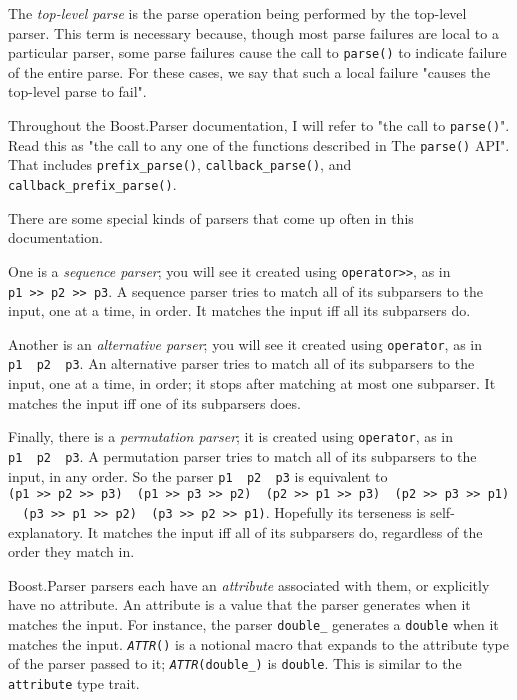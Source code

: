 \documentclass{MyBook}
\begin{document}
The \emph{top-level parse} is the parse operation being performed by the top-level parser. This term is necessary because, though most parse failures are local to a particular parser, some parse failures cause the call to \texttt{parse()} to indicate failure of the entire parse. For these cases, we say that such a local failure "causes the top-level parse to fail".

Throughout the Boost.Parser documentation, I will refer to "the call to \texttt{parse()}". Read this as "the call to any one of the functions described in The \texttt{parse()} API". That includes \texttt{prefix\_parse()}, \texttt{callback\_parse()}, and \texttt{callback\_prefix\_parse()}.

There are some special kinds of parsers that come up often in this documentation.

One is a \emph{sequence parser}; you will see it created using \texttt{operator>>}, as in \texttt{p1\ >>\ p2\ >>\ p3}. A sequence parser tries to match all of its subparsers to the input, one at a time, in order. It matches the input iff all its subparsers do.

Another is an \emph{alternative parser}; you will see it created using \texttt{operator\textbar{}}, as in \texttt{p1\ \textbar{}\ p2\ \textbar{}\ p3}. An alternative parser tries to match all of its subparsers to the input, one at a time, in order; it stops after matching at most one subparser. It matches the input iff one of its subparsers does.

Finally, there is a \emph{permutation parser}; it is created using \texttt{operator\textbar{}\textbar{}}, as in \texttt{p1\ \textbar{}\textbar{}\ p2\ \textbar{}\textbar{}\ p3}. A permutation parser tries to match all of its subparsers to the input, in any order. So the parser \texttt{p1\ \textbar{}\textbar{}\ p2\ \textbar{}\textbar{}\ p3} is equivalent to \texttt{(p1\ >>\ p2\ >>\ p3)\ \textbar{}\ (p1\ >>\ p3\ >>\ p2)\ \textbar{}\ (p2\ >>\ p1\ >>\ p3)\ \textbar{}\ (p2\ >>\ p3\ >>\ p1)\ \textbar{}\ (p3\ >>\ p1\ >>\ p2)\ \textbar{}\ (p3\ >>\ p2\ >>\ p1)}. Hopefully its terseness is self-explanatory. It matches the input iff all of its subparsers do, regardless of the order they match in.

Boost.Parser parsers each have an \emph{attribute} associated with them, or explicitly have no attribute. An attribute is a value that the parser generates when it matches the input. For instance, the parser \texttt{double\_} generates a \texttt{double} when it matches the input. \emph{\texttt{ATTR}}\texttt{()} is a notional macro that expands to the attribute type of the parser passed to it; \emph{\texttt{ATTR}}\texttt{(double\_)} is \texttt{double}. This is similar to the \texttt{attribute} type trait.
\end{document}
